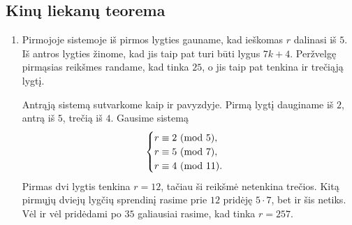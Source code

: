 \subsection*{Kinų liekanų teorema}
\begin{enumerate} 
\item 
Pirmojoje sistemoje iš pirmos lygties gauname, kad ieškomas $r$ dalinasi
iš $5$. Iš antros lygties žinome, kad jis taip pat turi būti lygus
$7k+4$. Peržvelgę pirmąsias reikšmes randame, kad tinka $25$, o jis taip
pat tenkina ir trečiąją lygtį.

Antrąją sistemą sutvarkome kaip ir pavyzdyje. Pirmą lygtį dauginame iš
$2$, antrą iš $5$, trečią iš $4$. Gausime sistemą $$\begin{cases}
r\equiv 2 \ (\text{mod } 5), \\ r\equiv 5 \ (\text{mod } 7), \\ r\equiv 4 \ (\text{mod } 11). \end{cases}$$
Pirmas dvi lygtis tenkina $r=12$, tačiau ši reikšmė netenkina trečios.
Kitą pirmųjų dviejų lygčių sprendinį rasime prie $12$ pridėję $5\cdot
7$, bet ir šis netiks. Vėl ir vėl pridėdami po $35$ galiausiai rasime,
kad tinka $r=257$.


\end{enumerate}
